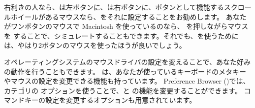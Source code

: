 \documentclass[a4paper,10pt,twoside]{book}
\begin{document}





右利きの人なら、\click は左ボタンに、\actclick は右ボタンに、ボタンとして機能するスクロールホイールがあるマウスなら、\metaclick をそれに設定することをお勧めします。
あなたがワンボタンのマウスで Macintosh を使っているのなら、\clover{} を押しながらマウスを \click することで、シミュレートすることもできます。それでも、\pharo を使うためには、やはり2ボタンのマウスを使ったほうが良いでしょう。

オペレーティングシステムのマウスドライバの設定を変えることで、あなた好みの動作を行うこともできます。
\pharo は、あなたが使っているキーボードのメタキーやマウスの設定を変更できる機能も持っています。
Preference Browser ()では、 カテゴリの  オプションを使うことで、\actclick と \metaclick の機能を変更することができます。
コマンドキーの設定を変更するオプションも用意されています。
\end{document}
